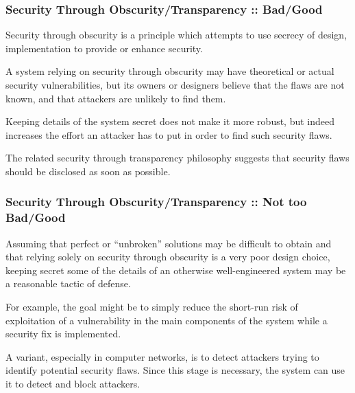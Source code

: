 \begin{frame}
  \frametitle{Security Through Obscurity/Transparency :: Bad/Good}

  Security through obscurity is a principle which attempts to use secrecy of
  design, implementation \etc{} to provide or enhance security.

  \-

  A system relying on security through obscurity may have theoretical or
  actual security vulnerabilities, but its owners or designers believe that
  the flaws are not known, and that attackers are unlikely to find them.

  \-

  Keeping details of the system secret does not make it more robust, but
  indeed increases the effort an attacker has to put in order to find such
  security flaws.

  \-

  The related security through transparency philosophy suggests that security
  flaws should be disclosed as soon as possible.
\end{frame}


\begin{frame}
  \frametitle{Security Through Obscurity/Transparency :: Not too Bad/Good}

  Assuming that perfect or ``unbroken'' solutions may be difficult to obtain
  and that relying solely on security through obscurity is a very poor design
  choice, keeping secret some of the details of an otherwise well-engineered
  system may be a reasonable tactic of defense.

  \-

  For example, the goal might be to simply reduce the short-run risk of
  exploitation of a vulnerability in the main components of the system while
  a security fix is implemented.

  \-

  A variant, especially in computer networks, is to detect attackers trying
  to identify potential security flaws. Since this stage is necessary, the
  system can use it to detect and block attackers.
\end{frame}


